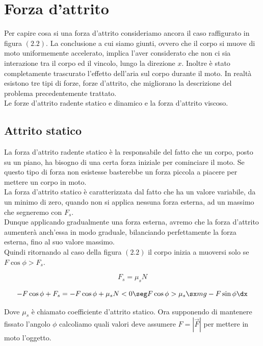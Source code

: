 \section{Forza d'attrito}
Per capire cosa si una forza d'attrito consideriamo ancora il caso raffigurato in figura $(2.2)$. La conclusione a cui siamo giunti, ovvero che il corpo si muove di moto uniformemente accelerato, implica l'aver considerato che non ci sia interazione tra il corpo ed il vincolo, lungo la direzione $x$. Inoltre è stato completamente trascurato l'effetto dell'aria sul corpo durante il moto.
In realtà esistono tre tipi di forze, forze d'attrito, che migliorano la descrizione del problema precedentemente trattato.\\
Le forze d'attrito radente statico e dinamico e la forza d'attrito viscoso.




\subsection{Attrito statico}
La forza d'attrito radente statico è la responsabile del fatto che un corpo, posto su un piano, ha bisogno di una certa forza iniziale per cominciare il moto. Se questo tipo di forza non esistesse basterebbe un forza piccola a piacere per mettere un corpo in moto.\\
La forza d'attrito statico è caratterizzata dal fatto che ha un valore variabile, da un minimo di zero, quando non si applica nessuna forza esterna, ad un massimo che segneremo con $F_s$.
\\Dunque applicando gradualmente una forza esterna, avremo che la forza d'attrito aumenterà anch'essa in modo graduale, bilanciando perfettamente la forza esterna, fino al suo valore massimo. \\Quindi ritornando al caso della figura $(2.2)$ il corpo inizia a muoversi solo se $F\cos\phi > F_s$. 

\begin{equation}
F_s = \mu_sN
\end{equation}

\begin{equation}
-F\cos\phi + F_s = -F\cos\phi + \mu_s N < 0\seg F\cos\phi > \mu_s\sx mg - F\sin\phi\dx
\end{equation}

Dove $\mu_s$ è chiamato coefficiente d'attrito statico. Ora supponendo di mantenere fissato l'angolo $\phi$ calcoliamo quali valori deve assumere $F = \left|\vec F\right|$ per mettere in moto l'oggetto.

